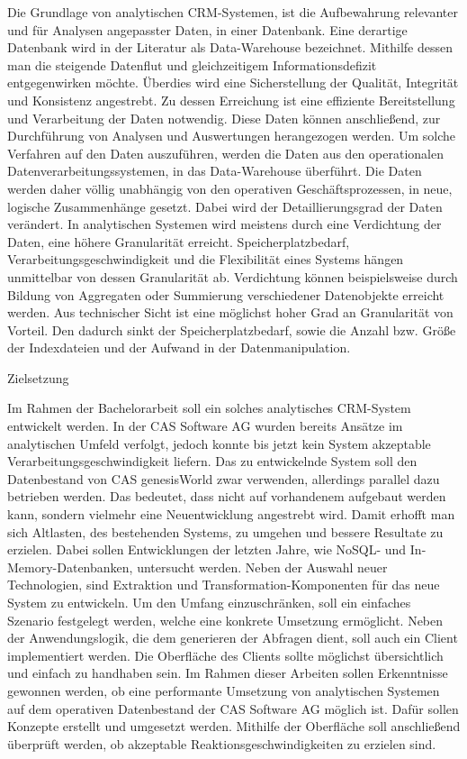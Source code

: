 Die Grundlage von analytischen CRM-Systemen, ist die Aufbewahrung relevanter und für Analysen angepasster Daten, in einer Datenbank. Eine derartige Datenbank wird in der Literatur als Data-Warehouse bezeichnet. Mithilfe dessen man die steigende Datenflut und gleichzeitigem Informationsdefizit entgegenwirken möchte. Überdies wird eine Sicherstellung der Qualität, Integrität und Konsistenz angestrebt. Zu dessen Erreichung ist eine effiziente Bereitstellung und Verarbeitung der Daten notwendig. Diese Daten können anschließend, zur Durchführung von Analysen und Auswertungen herangezogen werden. Um solche Verfahren auf den Daten auszuführen, werden die Daten aus den operationalen Datenverarbeitungssystemen, in das Data-Warehouse überführt. Die Daten werden daher völlig unabhängig von den operativen Geschäftsprozessen, in neue, logische Zusammenhänge gesetzt. 
Dabei wird der Detaillierungsgrad der Daten verändert. In analytischen Systemen wird meistens durch eine Verdichtung der Daten, eine höhere Granularität erreicht. Speicherplatzbedarf,  Verarbeitungsgeschwindigkeit und die Flexibilität eines Systems hängen unmittelbar von dessen Granularität ab. Verdichtung können beispielsweise durch Bildung von Aggregaten oder Summierung verschiedener Datenobjekte erreicht werden. Aus technischer Sicht ist eine möglichst hoher Grad an Granularität von Vorteil. Den dadurch sinkt der Speicherplatzbedarf, sowie die Anzahl bzw. Größe der Indexdateien und der Aufwand in der Datenmanipulation. 

Zielsetzung

Im Rahmen der Bachelorarbeit soll ein solches analytisches CRM-System entwickelt werden. In der CAS Software AG wurden bereits Ansätze im analytischen Umfeld verfolgt, jedoch konnte bis jetzt kein System akzeptable Verarbeitungsgeschwindigkeit liefern. Das zu entwickelnde System soll den Datenbestand von CAS genesisWorld zwar verwenden, allerdings parallel dazu betrieben werden. Das bedeutet, dass nicht auf vorhandenem aufgebaut werden kann, sondern vielmehr eine Neuentwicklung angestrebt wird. Damit erhofft man sich Altlasten, des bestehenden Systems, zu umgehen und bessere Resultate zu erzielen. Dabei sollen Entwicklungen der letzten Jahre, wie NoSQL- und In-Memory-Datenbanken, untersucht werden. Neben der Auswahl neuer Technologien, sind  Extraktion und Transformation-Komponenten für das neue System zu entwickeln. Um den Umfang einzuschränken, soll ein einfaches Szenario festgelegt werden, welche eine konkrete Umsetzung ermöglicht. Neben der Anwendungslogik, die dem generieren der Abfragen dient, soll auch ein Client implementiert werden. Die Oberfläche des Clients sollte möglichst übersichtlich und einfach zu handhaben sein. Im Rahmen dieser Arbeiten sollen Erkenntnisse gewonnen werden, ob eine performante Umsetzung von analytischen Systemen auf dem operativen Datenbestand der CAS Software AG möglich ist. Dafür sollen Konzepte erstellt und umgesetzt werden. Mithilfe der Oberfläche soll anschließend überprüft werden, ob akzeptable Reaktionsgeschwindigkeiten zu erzielen sind. 

